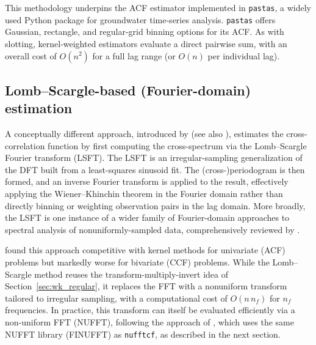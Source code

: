 \documentclass[twocolumn,10pt]{article}
\newcommand{\nufftcf}{\texttt{nufftcf}\xspace}
\newcommand{\pastas}{\texttt{pastas}\xspace}
\begin{document}
This methodology underpins the ACF estimator implemented in \pastas \citep{collenteur2019}, a widely used Python package for groundwater time-series analysis. \pastas offers Gaussian, rectangle, and regular-grid binning options for its ACF. As with slotting, kernel-weighted estimators evaluate a direct pairwise sum, with an overall cost of $O(n^2)$ for a full lag range (or $O(n)$ per individual lag).
%
\subsection{Lomb--Scargle-based (Fourier-domain) estimation}
\label{sec:lombscargle}
%
A conceptually different approach, introduced by
\cite{1976Ap&SS..39..447L,1982ApJ...263..835S} (see also
\cite{1989ApJ...343..874S,2018ApJS..236...16V}), estimates the
cross-correlation function by first computing the cross-spectrum via the
Lomb--Scargle Fourier transform (LSFT). The LSFT is an
irregular-sampling generalization of the DFT built from a least-squares
sinusoid fit. The (cross-)periodogram is then formed, and an inverse Fourier
transform is applied to the result, effectively applying the
Wiener--Khinchin theorem in the Fourier domain rather than directly binning
or weighting observation pairs in the lag domain. More broadly, the LSFT is
one instance of a wider family of Fourier-domain approaches to spectral
analysis of nonuniformly-sampled data, comprehensively reviewed by
\cite{BABU2010359}.

\cite{Rehfeld2011} found this approach competitive with kernel methods for
univariate (ACF) problems but markedly worse for bivariate (CCF) problems.
While the Lomb--Scargle method reuses the transform-multiply-invert idea of
Section~\ref{sec:wk_regular}, it replaces the FFT with a nonuniform transform
tailored to irregular sampling, with a computational cost of $O(n\,n_f)$ for
$n_f$ frequencies. In practice, this transform can itself be evaluated efficiently via a
non-uniform FFT (NUFFT), following the approach of \cite{Garrison2024},
which uses the same NUFFT library (FINUFFT) as \nufftcf, as described in the next
section.
%
\end{document}
